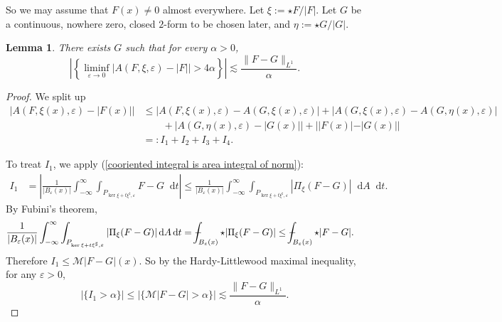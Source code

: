 \documentclass[reqno,11pt]{amsart}
\newcommand*\dif{\mathop{}\!\mathrm{d}}
\newtheorem{lemma}[theorem]{Lemma}
\theoremstyle{definition}
\numberwithin{equation}{section}
\def\Xint#1{\mathchoice
{\XXint\displaystyle\textstyle{#1}}%
{\XXint\textstyle\scriptstyle{#1}}%
{\XXint\scriptstyle\scriptscriptstyle{#1}}%
{\XXint\scriptscriptstyle\scriptscriptstyle{#1}}%
\!\int}
\def\XXint#1#2#3{{\setbox0=\hbox{$#1{#2#3}{\int}$ }
\vcenter{\hbox{$#2#3$ }}\kern-.6\wd0}}
\def\dashint{\Xint-}
\begin{document}
So we may assume that $F(x) \neq 0$ almost everywhere.
Let $\xi := \star F/|F|$.
Let $G$ be a continuous, nowhere zero, closed $2$-form to be chosen later, and $\eta := \star G/|G|$.

\begin{lemma}
There exists $G$ such that for every $\alpha > 0$,
$$\left|\left\{\liminf_{\varepsilon \to 0} |A(F, \xi, \varepsilon) - |F|| > 4\alpha\right\}\right| \lesssim \frac{\|F - G\|_{L^1}}{\alpha}.$$
\end{lemma}
\begin{proof}
We split up
\begin{align*}
|A(F, \xi(x), \varepsilon) - |F(x)||
&\leq |A(F, \xi(x), \varepsilon) - A(G, \xi(x), \varepsilon)| + |A(G, \xi(x), \varepsilon) - A(G, \eta(x), \varepsilon)| \\
&\qquad + |A(G, \eta(x), \varepsilon) - |G(x)|| + ||F(x)| - |G(x)||\\
&=: I_1 + I_2 + I_3 + I_4.
\end{align*}

To treat $I_1$, we apply (\ref{cooriented integral is area integral of norm}):
\begin{align*}
I_1
&= \left|\frac{1}{|B_\varepsilon(x)|} \int_{-\infty}^\infty \int_{P_{\ker \xi + t\xi^\sharp, \varepsilon}} F - G \dif t\right| 
\leq \frac{1}{|B_\varepsilon(x)|} \int_{-\infty}^\infty \int_{P_{\ker \xi + t\xi^\sharp, \varepsilon}} |\Pi_\xi(F - G)| \dif A \dif t.
\end{align*}
By Fubini's theorem, 
\begin{align*}
\frac{1}{|B_\varepsilon(x)|} \int_{-\infty}^\infty \int_{P_{\ker \xi + t\xi^\sharp, \varepsilon}} |\Pi_\xi(F - G)| \dif A \dif t
&= \dashint_{B_\varepsilon(x)} \star|\Pi_\xi(F - G)| \leq \dashint_{B_\varepsilon(x)} \star |F - G|.
\end{align*}
Therefore $I_1 \leq \mathcal M|F - G|(x)$.
So by the Hardy-Littlewood maximal inequality, for any $\varepsilon > 0$,
$$|\{I_1 > \alpha\}| \leq |\{\mathcal M |F - G| > \alpha\}| \lesssim \frac{\|F - G\|_{L^1}}{\alpha}.$$


\end{proof}
\end{document}
